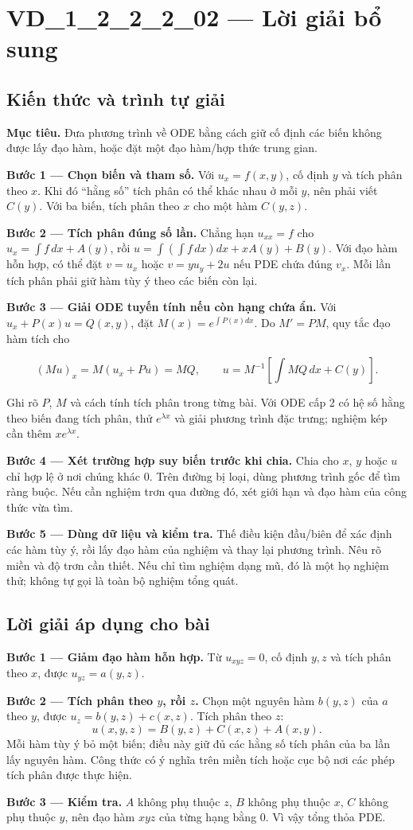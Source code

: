 \documentclass[10pt,a4paper]{article}
\begin{document}
\section*{VD\_1\_2\_2\_2\_02 — Lời giải bổ sung}
\subsection*{Kiến thức và trình tự giải}
\textbf{Mục tiêu.} Đưa phương trình về ODE bằng cách giữ cố định các biến không được lấy đạo hàm, hoặc đặt một đạo hàm/hợp thức trung gian.

\textbf{Bước 1 — Chọn biến và tham số.} Với $u_x=f(x,y)$, cố định $y$ và tích phân theo $x$. Khi đó “hằng số” tích phân có thể khác nhau ở mỗi $y$, nên phải viết $C(y)$. Với ba biến, tích phân theo $x$ cho một hàm $C(y,z)$.

\textbf{Bước 2 — Tích phân đúng số lần.} Chẳng hạn $u_{xx}=f$ cho $u_x=\int f\,dx+A(y)$, rồi $u=\int(\int f\,dx)dx+xA(y)+B(y)$. Với đạo hàm hỗn hợp, có thể đặt $v=u_x$ hoặc $v=yu_y+2u$ nếu PDE chứa đúng $v_x$. Mỗi lần tích phân phải giữ hàm tùy ý theo các biến còn lại.

\textbf{Bước 3 — Giải ODE tuyến tính nếu còn hạng chứa ẩn.} Với $u_x+P(x)u=Q(x,y)$, đặt $M(x)=e^{\int P(x)dx}$. Do $M'=PM$, quy tắc đạo hàm tích cho

\[
(Mu)_x=M(u_x+Pu)=MQ,\qquad
u=M^{-1}\left[\int MQ\,dx+C(y)\right].
\]

Ghi rõ $P$, $M$ và cách tính tích phân trong từng bài. Với ODE cấp 2 có hệ số hằng theo biến đang tích phân, thử $e^{\lambda x}$ và giải phương trình đặc trưng; nghiệm kép cần thêm $xe^{\lambda x}$.

\textbf{Bước 4 — Xét trường hợp suy biến trước khi chia.} Chia cho $x$, $y$ hoặc $u$ chỉ hợp lệ ở nơi chúng khác 0. Trên đường bị loại, dùng phương trình gốc để tìm ràng buộc. Nếu cần nghiệm trơn qua đường đó, xét giới hạn và đạo hàm của công thức vừa tìm.

\textbf{Bước 5 — Dùng dữ liệu và kiểm tra.} Thế điều kiện đầu/biên để xác định các hàm tùy ý, rồi lấy đạo hàm của nghiệm và thay lại phương trình. Nêu rõ miền và độ trơn cần thiết. Nếu chỉ tìm nghiệm dạng mũ, đó là một họ nghiệm thử; không tự gọi là toàn bộ nghiệm tổng quát.
\subsection*{Lời giải áp dụng cho bài}
\textbf{Bước 1 — Giảm đạo hàm hỗn hợp.} Từ $u_{xyz}=0$, cố định $y,z$ và tích phân theo $x$, được $u_{yz}=a(y,z)$.

\textbf{Bước 2 — Tích phân theo $y$, rồi $z$.} Chọn một nguyên hàm $b(y,z)$ của $a$ theo $y$, được $u_z=b(y,z)+c(x,z)$. Tích phân theo $z$:
\[u(x,y,z)=B(y,z)+C(x,z)+A(x,y).\]
Mỗi hàm tùy ý bỏ một biến; điều này giữ đủ các hằng số tích phân của ba lần lấy nguyên hàm. Công thức có ý nghĩa trên miền tích hoặc cục bộ nơi các phép tích phân được thực hiện.

\textbf{Bước 3 — Kiểm tra.} $A$ không phụ thuộc $z$, $B$ không phụ thuộc $x$, $C$ không phụ thuộc $y$, nên đạo hàm $xyz$ của từng hạng bằng 0. Vì vậy tổng thỏa PDE.
\end{document}
